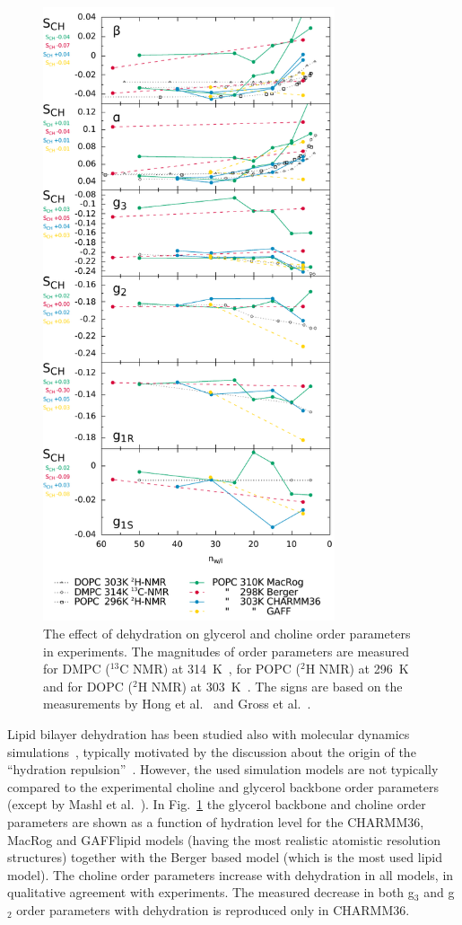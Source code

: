\documentclass[pre,aps,floatfix,authordate1-4,twocolumn]{revtex4-1}
\begin{document}
\begin{figure}[]
  \centering
  \includegraphics[width=8.6cm]{../DATAreportediINblog/dehydration.pdf}
  \caption{\label{ordPhydr}
    The effect of dehydration on glycerol and choline order parameters in experiments.
    The magnitudes of order parameters are measured for DMPC ($^{13}$C NMR) at 314~K~\cite{dvinskikh05b}, 
    for POPC ($^2$H NMR) at 296~K~\cite{bechinger91} and for DOPC ($^2$H NMR) at 303~K~\cite{ulrich94}. 
    The signs are based on the measurements by Hong et al.~\cite{hong95a,hong95b} 
    and Gross et al.~\cite{gross97}.
  }
\end{figure}

Lipid bilayer dehydration has been studied also with molecular dynamics simulations~\cite{mashl01,pertsin05,pertsin07,eun09,eun10,schneck12},
typically motivated by the  discussion about the origin of the ``hydration repulsion''~\cite{israelachvili,israelachvili96,sparr11}.
However, the used simulation models are not typically compared to the experimental choline and glycerol backbone
order parameters (except by Mashl et al.~\cite{mashl01}).
In Fig.~\ref{ordPhydr} the glycerol backbone and choline order parameters are shown as a function of hydration level for the CHARMM36, MacRog and GAFFlipid models (having the most realistic atomistic resolution structures) together with the Berger based model 
(which is the most used lipid model). The choline order parameters increase with dehydration in all
models, in qualitative agreement with experiments. 
The measured decrease in both g$_3$ and g$_2$ order parameters with dehydration is reproduced only in CHARMM36.
\end{document}
